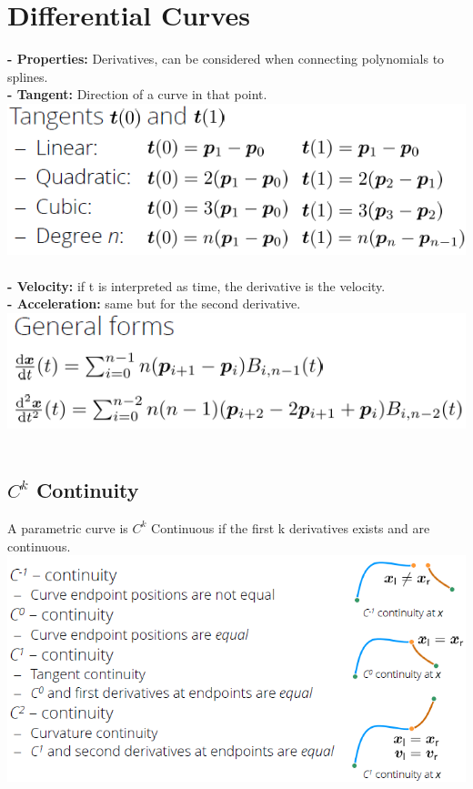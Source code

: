 \documentclass{article}
\begin{document}
\section{Differential Curves}
\textbf{- Properties: }Derivatives, can be considered when connecting polynomials to splines.\\
\textbf{- Tangent: }Direction of a curve in that point.\\
\includegraphics[scale=0.5]{image77.png}\\\\
\textbf{- Velocity: }if t is interpreted as time, the derivative is the velocity.\\
\textbf{- Acceleration: }same but for the second derivative.\\
\includegraphics[scale=0.5]{image78.png}\\\\
\subsection{$C^k$ Continuity}
A parametric curve is $C^k$ Continuous if the first k derivatives exists and are continuous.\\
\includegraphics[scale=0.5]{image79.png}\\\\
\end{document}
